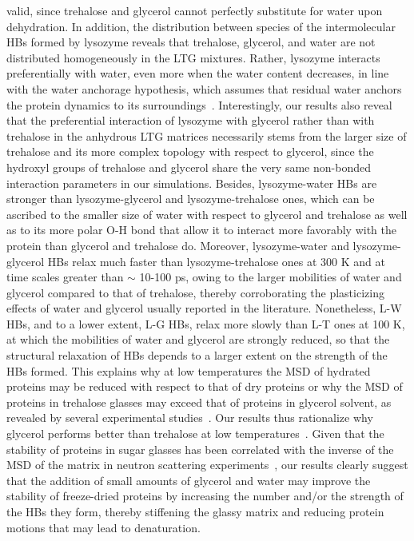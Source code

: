 \documentclass[journal=jpcbfk,manuscript=article]{achemso}
\begin{document}
\begin{singlespacing}
valid, since trehalose and glycerol cannot perfectly substitute for water upon dehydration. In addition, the 
distribution between species of the intermolecular HBs formed by lysozyme reveals that trehalose, glycerol, and water 
are not distributed homogeneously in the LTG mixtures. Rather, lysozyme interacts preferentially with water, even 
more when the water content decreases, in line with the water anchorage hypothesis, which assumes that residual water
anchors the protein dynamics to its surroundings~\cite{Cordone2005,Francia2008}. Interestingly, our results also 
reveal that the preferential interaction of lysozyme with glycerol rather than with trehalose in the anhydrous LTG 
matrices necessarily stems from the larger size of trehalose and its more complex topology with respect to glycerol, 
since the hydroxyl groups of trehalose and glycerol share the very same non-bonded interaction parameters in our 
simulations. Besides, lysozyme-water HBs are stronger than lysozyme-glycerol and lysozyme-trehalose ones, which 
can be ascribed to the smaller size of water with respect to glycerol and trehalose as well as to its more polar 
O-H bond that allow it to interact more favorably with the protein than glycerol and trehalose do. Moreover, 
lysozyme-water and lysozyme-glycerol HBs relax much faster than lysozyme-trehalose ones at 300 K and at time scales 
greater than $\sim$ 10-100 ps, owing to the larger mobilities of water and glycerol 
compared to that of trehalose, thereby corroborating the plasticizing effects of water and glycerol usually reported 
in the literature. Nonetheless, L-W HBs, and to a lower extent, L-G HBs, relax more slowly than L-T ones
at 100 K, at which the mobilities of water and glycerol are strongly reduced, so that the structural relaxation of
HBs depends to a larger extent on the strength of the HBs formed. This explains why at low temperatures the 
MSD of hydrated proteins may be reduced with respect to that of dry proteins or why the MSD of proteins in trehalose 
glasses may exceed that of proteins in glycerol solvent, as revealed by several experimental 
studies~\cite{Nickels2012,Sakai2013}. Our results thus rationalize why glycerol performs better than trehalose at low 
temperatures~\cite{Caliskan2004,Sakai2013}. Given that the stability of proteins in sugar glasses has been
correlated with the inverse of the MSD of the matrix in neutron scattering experiments~\cite{Cicerone2012}, our results 
clearly suggest that the addition of small amounts of glycerol and water may improve the stability of freeze-dried 
proteins by increasing the number and/or the strength of the HBs they form, thereby stiffening the glassy matrix and reducing protein 
motions that may lead to denaturation.


\end{singlespacing}
\end{document}
